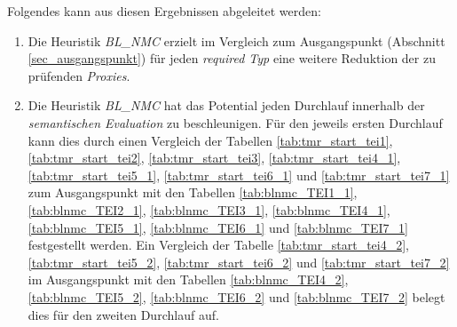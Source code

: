 \begin{multicols}{2}
\end{multicols}
\pagebreak
\begin{multicols}{2}
\end{multicols}
\noindent
Folgendes kann aus diesen Ergebnissen abgeleitet werden:
\begin{enumerate}
\item Die \Gls{Heuristik} \emph{BL\_NMC} erzielt im Vergleich zum Ausgangspunkt (Abschnitt \ref{sec_ausgangspunkt}) für jeden \emph{required Typ} eine weitere Reduktion der zu prüfenden \emph{Proxies}.

\item Die \Gls{Heuristik} \emph{BL\_NMC} hat das Potential jeden Durchlauf innerhalb der \emph{semantischen Evaluation} zu beschleunigen. Für den jeweils ersten Durchlauf kann dies durch einen Vergleich der Tabellen \ref{tab:tmr_start_tei1}, \ref{tab:tmr_start_tei2}, \ref{tab:tmr_start_tei3}, \ref{tab:tmr_start_tei4_1}, \ref{tab:tmr_start_tei5_1}, \ref{tab:tmr_start_tei6_1} und \ref{tab:tmr_start_tei7_1} zum Ausgangspunkt mit den Tabellen \ref{tab:blnmc_TEI1_1}, \ref{tab:blnmc_TEI2_1}, \ref{tab:blnmc_TEI3_1}, \ref{tab:blnmc_TEI4_1}, \ref{tab:blnmc_TEI5_1}, \ref{tab:blnmc_TEI6_1} und \ref{tab:blnmc_TEI7_1} festgestellt werden. Ein Vergleich der Tabelle \ref{tab:tmr_start_tei4_2}, \ref{tab:tmr_start_tei5_2}, \ref{tab:tmr_start_tei6_2} und \ref{tab:tmr_start_tei7_2} im Ausgangspunkt mit den Tabellen \ref{tab:blnmc_TEI4_2}, \ref{tab:blnmc_TEI5_2}, \ref{tab:blnmc_TEI6_2} und \ref{tab:blnmc_TEI7_2} belegt dies für den zweiten Durchlauf auf.
\end{enumerate}
